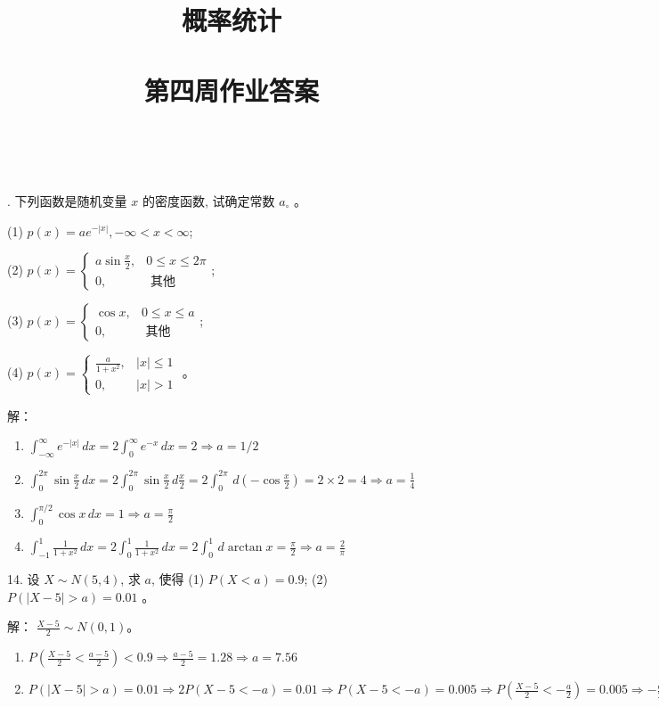 \documentclass[14pt]{scrartcl} %
\title{	
	\normalfont \huge
	\textsc{概率统计} \\ [25pt] %
	\horrule{0.5pt} \\[0.4cm] %
	\huge 第四周作业答案 \\ %
	\horrule{0.5pt} \\[0.4cm] %
	\date{}
}
\numberwithin{equation}{section} %
\numberwithin{figure}{section} %
\numberwithin{table}{section} %
\begin{document}
	. 下列函数是随机变量 $x$ 的密度函数, 试确定常数 $a_{\circ}$ 。
	
	(1) $p(x)=a e^{-|x|},-\infty<x<\infty$;
	
	(2) $p(x)=\left\{\begin{array}{cl}a\sin \frac{x}{2}, & 0 \leqslant x \leqslant 2\pi \\ 0, & \text { 其他 }\end{array}\right.$; 
	
	(3) $p(x)=\left\{\begin{array}{cl}\cos x, & 0 \leqslant x \leqslant a \\ 0, & \text { 其他 }\end{array}\right.$; 
	
	(4) $p(x)=\left\{\begin{array}{cc}\frac{a}{1+x^{2}}, & |x| \leqslant 1 \\ 0, & |x|>1\end{array}\right.$ 。
	
	\vspace*{1cm}
	解：
	\begin{enumerate}[(1)]
		\item $\int_{-\infty}^{\infty} e ^ { -|x|}\,dx = 2\int_{0}^{\infty} e ^ {-x} \,dx = 2 \Rightarrow a = 1 / 2$
		\item $\int_{0}^{2 \pi} \sin \frac{x}{2} \,dx = 2 \int_{0}^{2 \pi} \sin \frac{x}{2} \,d\frac{x}{2} = 2 \int_{0}^{2 \pi} \,d(-\cos\frac{x}{2}) = 2 \times 2 = 4 \Rightarrow  a = \frac{1}{4}$
		\item $\int_{0}^{\pi / 2} \cos x \,dx = 1 \Rightarrow a = \frac{\pi}{2}$
		\item $\int_{-1}^{1}\frac{1}{1 + x ^ 2} \,dx = 2 \int_{0}^{1} \frac{1}{1 + x ^ 2} \,dx = 2 \int_{0}^{1} \,d \arctan x = \frac{\pi}{2} \Rightarrow a = \frac{2}{\pi}$
	\end{enumerate}
	
	14. 设 $X \sim N(5,4)$, 求 $a$, 使得 (1) $P(X<a)=0.9$; (2) $P(|X-5|>a)=0.01$ 。
	
	\vspace*{1cm}
	解：
	$\frac{X - 5}{2} \sim N(0, 1)$。
	\begin{enumerate}[(1)]
		\item $P(\frac{X - 5}{2} < \frac{a - 5}{2}) < 0.9 \Rightarrow \frac{a - 5}{2} = 1.28 \Rightarrow a = 7.56$
		\item $P(|X - 5| > a) = 0.01 \Rightarrow 2P(X - 5 < -a) =0.01 \Rightarrow P(X - 5 < -a) = 0.005 \Rightarrow P(\frac{X - 5}{2} < - \frac{a}{2}) =0.005 \Rightarrow -\frac{a}{2} = 2.576 \Rightarrow a = 5.152$
	\end{enumerate}
	
\end{document}
